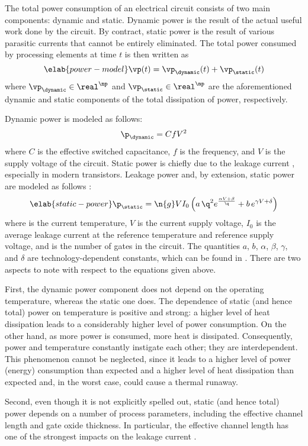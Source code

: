 The total power consumption of an electrical circuit consists of two main
components: dynamic and static. Dynamic power is the result of the actual useful
work done by the circuit. By contract, static power is the result of various
parasitic currents that cannot be entirely eliminated. The total power consumed
by \np processing elements at time $t$ is then written as
\begin{equation} \elab{power-model}
  \vp(t) = \vp_\dynamic(t) + \vp_\static(t)
\end{equation}
where $\vp_\dynamic \in \real^\np$ and $\vp_\static \in \real^\np$ are the
aforementioned dynamic and static components of the total dissipation of power,
respectively.

Dynamic power is modeled as follows:
\[
  \p_\dynamic = C f V^2
\]
where $C$ is the effective switched capacitance, $f$ is the frequency, and $V$
is the supply voltage of the circuit. Static power is chiefly due to the leakage
current \cite{chandrakasan2000, srivastava2010, juan2011, juan2012}, especially
in modern  transistors. Leakage power and, by extension, static power
are modeled as follows \cite{liao2005}:
\begin{equation} \elab{static-power}
  \p_\static = \n{g} V I_0 \left(a \, \q^2 e^{\frac{\alpha V + \beta}{\q}} + b \, e^{\gamma V + \delta}\right)
\end{equation}
where \q is the current temperature, $V$ is the current supply voltage, $I_0$ is
the average leakage current at the reference temperature and reference supply
voltage, and  is the number of gates in the circuit. The quantities $a$,
$b$, $\alpha$, $\beta$, $\gamma$, and $\delta$ are technology-dependent
constants, which can be found in \cite{liao2005}. There are two aspects to note
with respect to the equations given above.

First, the dynamic power component does not depend on the operating temperature,
whereas the static one does. The dependence of static (and hence total) power on
temperature is positive and strong: a higher level of heat dissipation leads to
a considerably higher level of power consumption. On the other hand, as more
power is consumed, more heat is dissipated. Consequently, power and temperature
constantly instigate each other; they are interdependent. This phenomenon cannot
be neglected, since it leads to a higher level of power (energy) consumption
than expected and a higher level of heat dissipation than expected and, in the
worst case, could cause a thermal runaway.

Second, even though it is not explicitly spelled out, static (and hence total)
power depends on a number of process parameters, including the effective channel
length and gate oxide thickness. In particular, the effective channel length has
one of the strongest impacts on the leakage current \cite{juan2012}.

